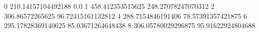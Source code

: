 0 210.14157104492188 0.0
1 458.412353515625 248.27078247070312
2 306.86572265625 96.72415161132812
4 288.7154846191406 78.57391357421875
6 295.17828369140625 85.03671264648438
8 306.05780029296875 95.91622924804688
